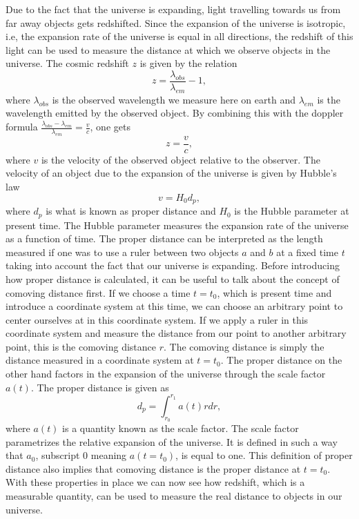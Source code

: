 Due to the fact that the universe is expanding, light travelling towards us from
far away objects gets redshifted. Since the expansion of the universe is
isotropic, i.e, the expansion rate of the universe is equal in all directions,
the redshift of this light can be used to measure the distance at which we
observe objects in the universe. The cosmic redshift $z$ is given by the
relation
\begin{equation}
    z = \frac{\lambda_{obs}}{\lambda_{em}} - 1,
\end{equation}
where $\lambda_{obs}$ is the observed wavelength we measure here on earth and
$\lambda_{em}$ is the wavelength emitted by the observed object. By combining this with the doppler formula
$\frac{\lambda_{obs}-\lambda_{em}}{\lambda_{em}} = \frac{v}{c}$, one gets
\begin{equation}
    z = \frac{v}{c},
\end{equation}
where $v$ is the velocity of the observed object relative to the observer. The
velocity of an object due to the expansion of the universe is given by Hubble's law
\begin{equation}
    v = H_0 d_p,
\end{equation}
where $d_p$ is what is known as proper distance and $H_0$ is the Hubble
parameter at present time. The Hubble parameter measures the expansion rate of
the universe as a function of time. The proper distance can be interpreted as the length measured if one
was to use a ruler between two objects $a$ and $b$ at a fixed time $t$ taking
into account the fact that our universe is expanding. Before introducing how proper distance is calculated, it can be
useful to talk about the concept of comoving distance first. If we choose a time
$t=t_0$, which is present time and introduce a coordinate system at this time,
we can choose an arbitrary point to center ourselves at in this coordinate
system. If we apply a ruler in this coordinate system and measure the distance
from our point to another arbitrary point, this is the comoving distance $r$. The
comoving distance is simply the distance measured in a coordinate system at
$t=t_0$. The proper distance on the other hand factors in the expansion of the
universe through the scale factor $a(t)$. The proper distance is given as
\begin{equation}
    d_p = \int_{r_0}^{r_1}a(t)rdr,
\end{equation}
where $a(t)$ is a quantity known as the scale factor. The scale factor parametrizes the relative expansion of the
universe. It is defined in such a way that $a_0$, subscript $0$ meaning
$a(t=t_0)$, is equal to one. This definition of
proper distance also implies that comoving distance is the proper distance at $t=t_0$.
With these properties in place we can now see how redshift, which is a
measurable quantity, can be used to measure the real distance to objects in our universe.\\

